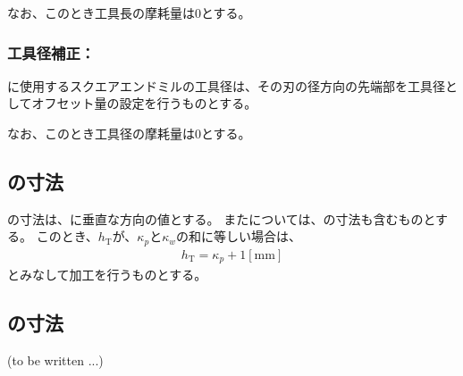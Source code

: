 なお、このとき工具長の摩耗量は0とする。


\subsubsection{工具径補正：\nameOutcutMilling}
\OutcutMilling に使用するスクエアエンドミルの工具径は、その刃の径方向の先端部を工具径としてオフセット量の設定を行うものとする。

なお、このとき工具径の摩耗量は0とする。


\subsection{\nameOutcutLength の寸法}
\nameOutcutLength の寸法は、\EndFace に垂直な方向の値とする。
また\TopOutcutLength については、\KeywayWidth の寸法も含むものとする。
このとき、\TopOutcutLength$h_\mathrm T$が、\KeywayPos$\kappa_p$と\KeywayWidth$\kappa_w$の和に等しい場合は、
\begin{align*}
  h_\mathrm T = \kappa_p+1[\text{mm}]
\end{align*}
とみなして加工を行うものとする。


\subsection{\nameCurvedOutcut の寸法\TBW}
(to be written ...)


